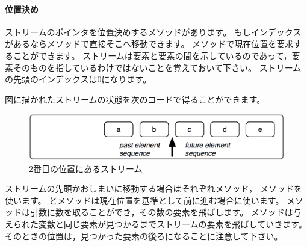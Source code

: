 \documentclass[a4paper,10pt,twoside]{book}
\begin{document}
\paragraph{位置決め} 
ストリームのポインタを位置決めするメソッドがあります。
もしインデックスがあるならメソッドで直接そこへ移動できます。
メソッドで現在位置を要求することができます。
ストリームは要素と要素の間を示しているのであって，要素そのものを指しているわけではないことを覚えておいて下さい。
ストリームの先頭のインデックスは0になります。


図に描かれたストリームの状態を次のコードで得ることができます。



\begin{figure}[h!t]
\centerline{\includegraphics[scale=0.5]{ab_cdeStef}}
\caption{2番目の位置にあるストリーム}
\vspace{.2in}
\end{figure}

ストリームの先頭かおしまいに移動する場合はそれぞれメソッド，
メソッドを使います。
とメソッドは現在位置を基準として前に進む場合に使います。
メソッドは引数に数を取ることができ，その数の要素を飛ばします。
メソッドは与えられた変数と同じ要素が見つかるまでストリームの要素を飛ばしていきます。
そのときの位置は，見つかった要素の後ろになることに注意して下さい。
\end{document}
